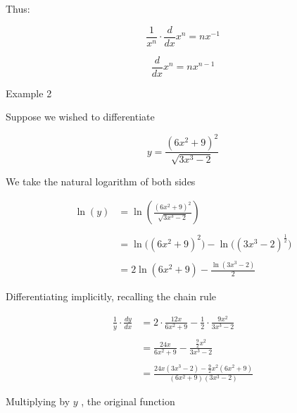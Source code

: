 Thus:



$$\frac{1}{x^n}\cdot\frac{d}{dx}x^n=nx^{-1}$$



$$\frac{d}{dx}x^n=nx^{n-1}$$



Example 2



Suppose we wished to differentiate   

                                                                                                    

$$y=\frac{(6x^2+9)^2}{\sqrt{3x^3-2}}$$



We take the natural logarithm of both sides

  

 \begin{align}    

 \ln(y)&=\ln\left(\frac{(6x^2+9)^2}{\sqrt{3x^3-2}}\right) \\\\       

 &=\ln\big((6x^2+9)^2\big)-\ln\big((3x^3-2)^{\frac12}\big) \\\\       

 &=2\ln(6x^2+9)-\frac{\ln(3x^3-2)}{2}
 \end{align} 



Differentiating implicitly, recalling the chain rule 



 \begin{align}  

 \frac{1}{y}\cdot\frac                                                

 {dy}{dx}&=2\cdot\frac{12x}{6x^2+9}-\frac12\cdot\frac{9x^2}{3x^3-2} \\\\ 

 &=\frac{24x}{6x^2+9}-\frac{\frac{9}{2}x^2}{3x^3-2} \\\\                 

 &=\frac{24x(3x^3-2)-\frac92x^2(6x^2+9)}{(6x^2+9)(3x^3-2)}
 \end{align} 



Multiplying by $y$ , the original function

     

